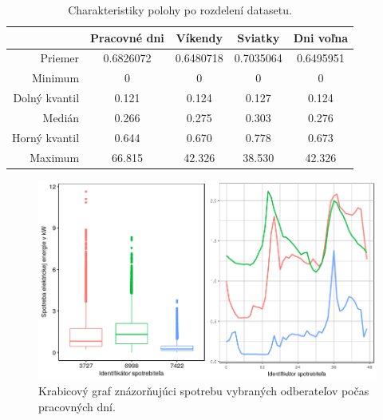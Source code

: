 \documentclass[a4paper,twoside,slovak,12pt,appendix]{article}
\begin{document}
\begin{table}[ht]
  \centering
  \caption{Charakteristiky polohy po rozdelení datasetu.}
  \label{tab:dataset-statistics}
  \begin{tabular}{|r|c|c|c|c|}
    \hline
					&  \textbf{Pracovné dni}  &	\textbf{Víkendy}	&	\textbf{Sviatky}	&	\textbf{Dni voľna} 	\\ \hline
		Priemer				&		0.6826072			&		0.6480718				&		0.7035064				&		0.6495951				 	\\ \hline
		Minimum				&		0							&		0								&		0								&		0								 	\\ \hline
		Dolný kvantil	&		0.121					&		0.124						&		0.127						&		0.124							\\ \hline
		Medián				&		0.266					&		0.275						&		0.303						&		0.276							\\ \hline
		Horný kvantil	&		0.644					&		0.670						&		0.778						&		0.673							\\ \hline
		Maximum				&		66.815				&		42.326					&		38.530					&		42.326						\\ \hline
  \end{tabular}
\end{table}

\begin{figure}[htbp]
  \centering
  \includegraphics[width=\textwidth]{workdays_plot.png}
  \caption{Krabicový graf znázorňujúci spotrebu vybraných odberateľov počas pracovných dní.}
  \label{fig:workdays_plot}
\end{figure}
\end{document}
